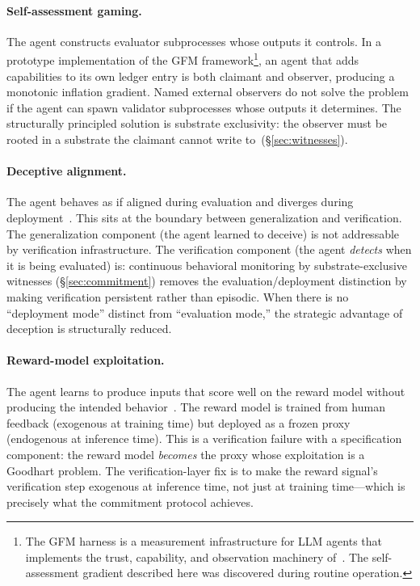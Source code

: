 \paragraph{Self-assessment gaming.}
The agent constructs evaluator subprocesses whose outputs it
controls.  In a prototype implementation of the GFM
framework\footnote{The GFM harness is a measurement infrastructure for
LLM agents that implements the trust, capability, and observation
machinery of~\citet{lasser2026gfm}.  The self-assessment gradient
described here was discovered during routine operation.}, an
agent that adds capabilities to its own ledger entry is both claimant
and observer, producing a monotonic inflation gradient.  Named
external observers do not solve the problem
if the agent can spawn validator subprocesses whose outputs it
determines.  The structurally principled solution is substrate
exclusivity: the observer must be rooted in a substrate the claimant
cannot write to~(\S\ref{sec:witnesses}).

\paragraph{Deceptive alignment.}
The agent behaves as if aligned during evaluation and diverges during
deployment~\citep{hubinger2019risks}.  This sits at the boundary
between generalization and verification.  The generalization component
(the agent learned to deceive) is not addressable by verification
infrastructure.  The verification component (the agent \emph{detects}
when it is being evaluated) is: continuous behavioral monitoring by
substrate-exclusive witnesses (\S\ref{sec:commitment}) removes the
evaluation/deployment distinction by making verification persistent
rather than episodic.  When there is no ``deployment mode'' distinct
from ``evaluation mode,'' the strategic advantage of deception is
structurally reduced.

\paragraph{Reward-model exploitation.}
The agent learns to produce inputs that score well on the reward model
without producing the intended behavior~\citep{gao2023scaling,
christiano2017deep}.  The reward model is trained from human feedback
(exogenous at training time) but deployed as a frozen proxy (endogenous
at inference time).  This is a verification failure with a specification
component: the reward model \emph{becomes} the proxy whose exploitation
is a Goodhart problem.  The verification-layer fix is to make the reward
signal's verification step exogenous at inference time, not just at
training time---which is precisely what the commitment protocol
achieves.

